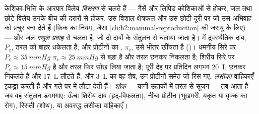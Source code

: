 \begin{proposition}[विनिमय के दो प्रकार]\label{prop:b2:blood-circulation:exchange}
केशिका-भित्ति के आरपार विलेय \emph{विसरण} से चलते हैं --- गैसें
और लिपिड कोशिकाओं से होकर, जल तथा छोटे विलेय उनके बीच की
दरारों से होकर, उस विशाल क्षेत्रफल और उस छोटी दूरी पर जो उस अभिवाह को
प्रचुर बना देते हैं (फ़िक का नियम, जैसा
\cref{ch:b2:mammal-reproduction} की जरायु के लिए) --- और जल
\emph{स्थूल प्रवाह} से चलता है, जो दो दाबों के संतुलन से चलाया जाता है।
 में द्रवस्थैतिक दाब, $P_c$, तरल को बाहर धकेलता है; और
 प्रोटीनों का , $\pi_c$, उसे भीतर खींचता है
(\emph{})। धमनीय सिरे पर $P_c \approx
\qty{35}{mmHg}$ $\pi_c \approx \qty{25}{mmHg}$ से बड़ा है और तरल
छनकर निकलता है; शिरीय सिरे पर $P_c \approx \qty{15}{mmHg}$ है और तरल
फिर सोख लिया जाता है; पूरी देह पर प्रतिदिन लगभग \qty{20}{L} छनकर
निकलते हैं और \qty{17}{L} लौटते हैं, और \qty{3}{L} का वह शेष, उन
प्रोटीनों समेत जो रिस गए, \emph{लसीका} वाहिकाएँ इकट्ठा करती हैं
और गले पर  में लौटा देती हैं। \emph{शोफ} --- यानी ऊतकों में
तरल से सूजन --- तब आता है जब वह संतुलन डगमगाए:
ऊँचा शिरीय दाब (हृद्-विफलता), नीचा  प्रोटीन
(भुखमरी, यकृत या वृक्क का रोग), रिसती 
(शोथ), या अवरुद्ध लसीका वाहिकाएँ।
\end{proposition}

